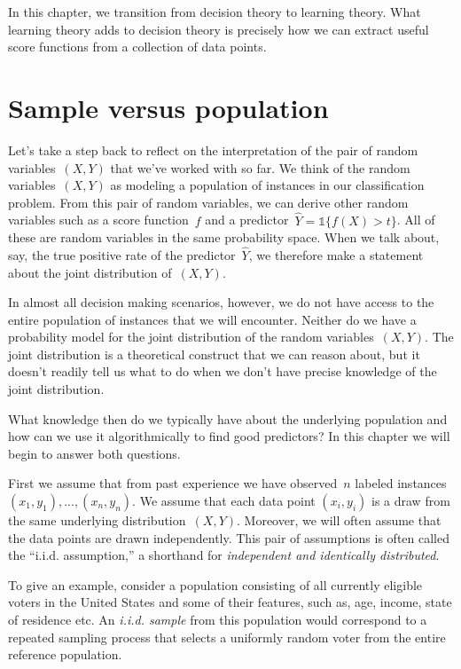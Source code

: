 \documentclass{tufte-book}
\begin{document}
In this chapter, we transition from decision theory to learning theory.
What learning theory adds to decision theory is precisely how we can
extract useful score functions from a collection of data points.

\hypertarget{sample-versus-population}{%
\section{Sample versus population}\label{sample-versus-population}}

Let's take a step back to reflect on the interpretation of the pair of
random variables~\((X, Y)\) that we've worked with so far. We think of
the random variables~\((X, Y)\) as modeling a population of instances in
our classification problem. From this pair of random variables, we can
derive other random variables such as a score function~\(f\) and a
predictor~\(\hat Y = \mathbb{1}\{f(X) > t\}\). All of these are random
variables in the same probability space. When we talk about, say, the
true positive rate of the predictor~\(\hat Y\), we therefore make a
statement about the joint distribution of~\((X, Y)\).

In almost all decision making scenarios, however, we do not have access
to the entire population of instances that we will encounter. Neither do
we have a probability model for the joint distribution of the random
variables~\((X, Y)\). The joint distribution is a theoretical construct
that we can reason about, but it doesn't readily tell us what to do when
we don't have precise knowledge of the joint distribution.

What knowledge then do we typically have about the underlying population
and how can we use it algorithmically to find good predictors? In this
chapter we will begin to answer both questions.

First we assume that from past experience we have observed~\(n\) labeled
instances~\((x_1, y_1),...,(x_n, y_n)\). We assume that each data point
\((x_i, y_i)\) is a draw from the same underlying
distribution~\((X, Y)\). Moreover, we will often assume that the data
points are drawn independently. This pair of assumptions is often called
the ``i.i.d. assumption,'' a shorthand for \emph{independent and
identically distributed}.

To give an example, consider a population consisting of all currently
eligible voters in the United States and some of their features, such
as, age, income, state of residence etc. An \emph{i.i.d. sample} from
this population would correspond to a repeated sampling process that
selects a uniformly random voter from the entire reference population.
\end{document}

